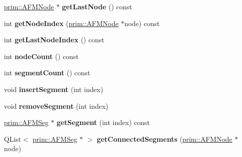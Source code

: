 \begin{DoxyCompactItemize}
\item 
\hyperlink{classprim_1_1AFMNode}{prim\+::\+A\+F\+M\+Node} $\ast$ {\bfseries get\+Last\+Node} () const \hypertarget{classprim_1_1AFMPath_a8d108e802c0a062e794cade70e5d3292}{}\label{classprim_1_1AFMPath_a8d108e802c0a062e794cade70e5d3292}

\item 
int {\bfseries get\+Node\+Index} (\hyperlink{classprim_1_1AFMNode}{prim\+::\+A\+F\+M\+Node} $\ast$node) const \hypertarget{classprim_1_1AFMPath_a75ca95fcda304a6c2ae79d8c6861fa67}{}\label{classprim_1_1AFMPath_a75ca95fcda304a6c2ae79d8c6861fa67}

\item 
int {\bfseries get\+Last\+Node\+Index} () const \hypertarget{classprim_1_1AFMPath_a6ad23059e40cd60aea15742284c85cf3}{}\label{classprim_1_1AFMPath_a6ad23059e40cd60aea15742284c85cf3}

\item 
int {\bfseries node\+Count} () const \hypertarget{classprim_1_1AFMPath_a1e4352d953ba155e599cc3403b0bb370}{}\label{classprim_1_1AFMPath_a1e4352d953ba155e599cc3403b0bb370}

\item 
int {\bfseries segment\+Count} () const \hypertarget{classprim_1_1AFMPath_aeb7a1b3a2bfb59c925a40dda4c050145}{}\label{classprim_1_1AFMPath_aeb7a1b3a2bfb59c925a40dda4c050145}

\item 
void {\bfseries insert\+Segment} (int index)\hypertarget{classprim_1_1AFMPath_abf18c50236d56de583109768a013f5ce}{}\label{classprim_1_1AFMPath_abf18c50236d56de583109768a013f5ce}

\item 
void {\bfseries remove\+Segment} (int index)\hypertarget{classprim_1_1AFMPath_ada21725f8981a80073935db0870ca1d9}{}\label{classprim_1_1AFMPath_ada21725f8981a80073935db0870ca1d9}

\item 
\hyperlink{classprim_1_1AFMSeg}{prim\+::\+A\+F\+M\+Seg} $\ast$ {\bfseries get\+Segment} (int index) const \hypertarget{classprim_1_1AFMPath_acb1b3421b2f740a8542f44978ce6f684}{}\label{classprim_1_1AFMPath_acb1b3421b2f740a8542f44978ce6f684}

\item 
Q\+List$<$ \hyperlink{classprim_1_1AFMSeg}{prim\+::\+A\+F\+M\+Seg} $\ast$ $>$ {\bfseries get\+Connected\+Segments} (\hyperlink{classprim_1_1AFMNode}{prim\+::\+A\+F\+M\+Node} $\ast$node)\hypertarget{classprim_1_1AFMPath_a1a757d57c679a56b72b01a21b84f837d}{}\label{classprim_1_1AFMPath_a1a757d57c679a56b72b01a21b84f837d}


\end{DoxyCompactItemize}
